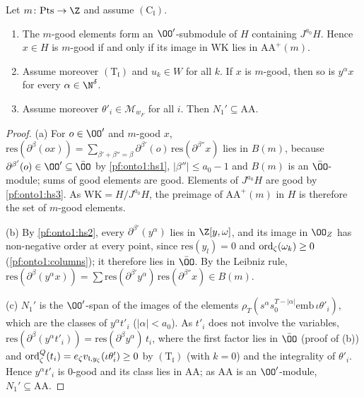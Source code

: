 \begin{lemma}\label{pf:onto1:good}
Let $m\colon\mathrm{Pts}\to\Z$ and assume $(\mathrm C_{\mathfrak l})$.
\begin{enumerate}[label=(\alph*)]
\item The $m$-good elements form an $\OO'$-submodule of $H$ containing $J^{a_0}H$. Hence $x\in H$ is $m$-good if and only if
its image in $\mathrm{WK}$ lies in $\mathrm{AA}^+(m)$.
\item Assume moreover $(\mathrm T_{\mathfrak l})$ and $u_k\in W$ for all $k$. If $x$ is $m$-good, then so is $y^\alpha x$ for every
$\alpha\in\N^\delta$.
\item Assume moreover $\theta'_i\in\mathcal M_{w_F}$ for all $i$. Then $N_1'\subseteq\mathrm{AA}$.
\end{enumerate}
\end{lemma}

\begin{proof}
(a) For $o\in\OO'$ and $m$-good $x$, $\mathrm{res}(\partial^\beta(ox))=\sum_{\beta'+\beta''=\beta}\partial^{\beta'}(o)\,
\mathrm{res}(\partial^{\beta''}x)$ lies in $B(m)$, because $\partial^{\beta'}(o)\in\OO'\subseteq\bar\OO$ by \ref{pf:onto1:hs1}, $|\beta''|\le
a_0-1$ and $B(m)$ is an $\bar\OO$-module; sums of good elements are good. Elements of $J^{a_0}H$ are good by
\ref{pf:onto1:hs3}. As $\mathrm{WK}=H/J^{a_0}H$, the preimage of $\mathrm{AA}^+(m)$ in $H$ is therefore the set of $m$-good
elements.

(b) By \ref{pf:onto1:hs2}, every $\partial^{\beta'}(y^\alpha)$ lies in $\Z[y,\omega]$, and its image in $\OO_Z$ has non-negative
order at every point, since $\mathrm{res}(y_l)=0$ and $\operatorname{ord}_\zeta(\omega_k)\ge0$ (\cref{pf:onto1:columns}); it therefore
lies in $\bar\OO$. By the Leibniz rule, $\mathrm{res}(\partial^\beta(y^\alpha x))=\sum\mathrm{res}(\partial^{\beta'}y^\alpha)\,\mathrm{res}
(\partial^{\beta''}x)\in B(m)$.

(c) $N_1'$ is the $\OO'$-span of the images of the elements $\rho_T(s^\alpha s_0^{T-|\alpha|}\mathrm{emb}\,\iota\theta'_i)$, which are
the classes of $y^\alpha t'_i$ ($|\alpha|<a_0$). As $t'_i$ does not involve the variables,
$\mathrm{res}(\partial^\beta(y^\alpha t'_i))=\mathrm{res}(\partial^\beta y^\alpha)\,t_i$, where the first factor lies in $\bar\OO$ (proof
of (b)) and $\operatorname{ord}^Q_\zeta(t_i)=e_\zeta v_{\mathfrak l,y_\zeta}(\iota\theta'_i)\ge0$ by $(\mathrm T_{\mathfrak l})$ (with $k=0$) and
the integrality of $\theta'_i$. Hence $y^\alpha t'_i$ is $0$-good and its class lies in $\mathrm{AA}$; as $\mathrm{AA}$ is an
$\OO'$-module, $N_1'\subseteq\mathrm{AA}$.
\end{proof}

